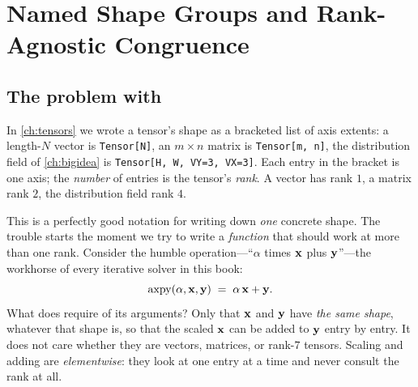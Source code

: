 \chapter{Named Shape Groups and Rank-Agnostic Congruence}
\label{ch:shapes}


\section{The problem with \texorpdfstring{}{Tensor[N]}}
\label{sec:sh-problem}

In \cref{ch:tensors} we wrote a tensor's shape as a bracketed list of axis
extents: a length-$N$ vector is \lstinline[style=l4style]|Tensor[N]|, an
$m\times n$ matrix is \lstinline[style=l4style]|Tensor[m, n]|, the
distribution field of \cref{ch:bigidea} is
\lstinline[style=l4style]|Tensor[H, W, VY=3, VX=3]|. Each entry in the bracket
is one axis; the \emph{number} of entries is the tensor's \emph{rank}. A
vector has rank $1$, a matrix rank $2$, the distribution field rank $4$.

This is a perfectly good notation for writing down \emph{one} concrete shape.
The trouble starts the moment we try to write a \emph{function} that should
work at more than one rank. Consider the humble 
operation---``$\alpha$ times $\mathbf{x}$ plus $\mathbf{y}$''---the workhorse of every
iterative solver in this book:
\[
  \mathrm{axpy}(\alpha,\mathbf{x},\mathbf{y}) \;=\; \alpha\,\mathbf{x} + \mathbf{y} .
\]
What does  require of its arguments? Only that $\mathbf{x}$ and $\mathbf{y}$ have
\emph{the same shape}, whatever that shape is, so that the scaled $\mathbf{x}$ can be
added to $\mathbf{y}$ entry by entry. It does not care whether they are vectors,
matrices, or rank-$7$ tensors. Scaling and adding are \emph{elementwise}: they
look at one entry at a time and never consult the rank at all.

